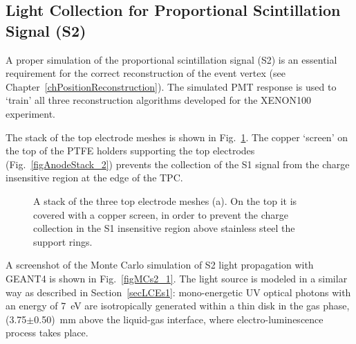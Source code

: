 \subsection{Light Collection for Proportional Scintillation Signal (S2)}
\label{secLCEs2}

A proper simulation of the proportional scintillation signal (S2) is an essential requirement for the correct reconstruction of the event vertex (see Chapter~\ref{chPositionReconstruction}). The simulated PMT response is used to `train' all three reconstruction algorithms developed for the XENON100 experiment.

The stack of the top electrode meshes is shown in Fig.~\ref{figAnodeStack}. The copper `screen' on  the top of the PTFE holders supporting the top electrodes (Fig.~\ref{figAnodeStack_2}) prevents the collection of the S1 signal from the charge insensitive region at the edge of the TPC.

\begin{figure}[!h]
\centering
{}
\caption[Top electrode meshes]{A stack of the three top electrode meshes (a). On the top it is covered with a copper screen, in order to prevent the charge collection in the S1 insensitive region above stainless steel the support rings.}
\label{figAnodeStack}
\end{figure}

A screenshot of the Monte Carlo simulation of S2 light propagation with GEANT4 is shown in Fig.~\ref{figMCs2_1}. The light source is modeled in a similar way as described in Section~\ref{secLCEs1}: mono-energetic UV optical photons with an energy of 7~eV are isotropically generated within a thin disk in the gas phase, (3.75$\pm$0.50)~mm above the liquid-gas interface, where electro-luminescence process takes place. 

